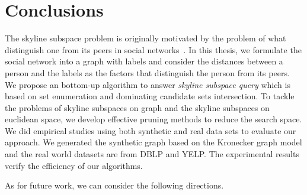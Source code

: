 
%
%

\chapter{Conclusions}
\label{ch:con}

The skyline subspace problem is originally motivated by the problem of what distinguish one from its peers in social networks~\cite{lo2013distinguish}. In this thesis, we formulate the social network into a graph with labels and consider the distances between a person and the labels as the factors that distinguish the person from its peers. We propose an bottom-up algorithm to answer \emph{skyline subspace query} which is based on set enumeration and dominating candidate sets intersection. To tackle the problems of skyline subspaces on graph and the skyline subspaces on euclidean space, we develop effective pruning methods to reduce the search space. 
We did empirical studies using both synthetic and real data sets to evaluate our approach. We generated the synthetic graph based on the Kronecker graph model and the real world datasets are from DBLP and YELP. The experimental results verify the efficiency of our algorithms.


As for future work, we can consider the following directions.  

